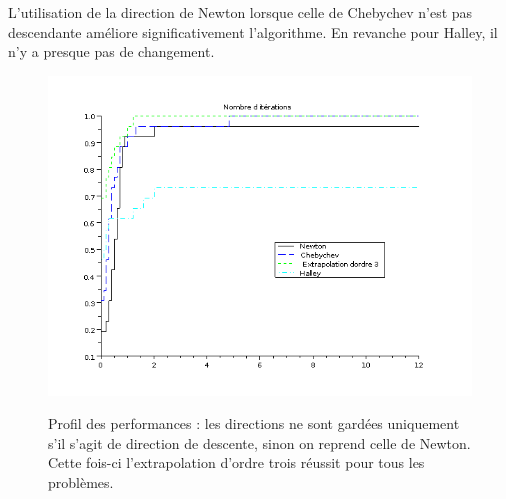 L'utilisation de la direction de Newton lorsque celle de Chebychev n'est pas descendante am\'eliore significativement
l'algorithme. En revanche pour Halley, il n'y a presque pas de changement.
\begin{figure}
\caption{Profil des performances : les directions ne sont gard\'ees uniquement s'il s'agit de direction de descente, sinon on 
reprend celle de Newton. Cette fois-ci l'extrapolation d'ordre trois r\'eussit pour tous les probl\`emes.
}\center
\includegraphics[scale=0.6]{figures/newtonquandpasdescendante.png}
\label{fig:dirnewton}
\end{figure}





